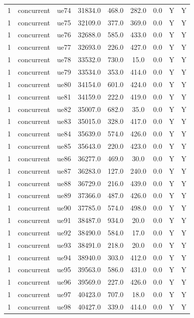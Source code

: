 \begin{table}[ht]
\begin{tabular}{|c|c|c|c|c|c|c|c|c|}
1 & concurrent & ue74 & 31834.0 & 468.0 & 282.0 & 0.0 & Y & Y \\
1 & concurrent & ue75 & 32109.0 & 377.0 & 369.0 & 0.0 & Y & Y \\
1 & concurrent & ue76 & 32688.0 & 585.0 & 433.0 & 0.0 & Y & Y \\
1 & concurrent & ue77 & 32693.0 & 226.0 & 427.0 & 0.0 & Y & Y \\
1 & concurrent & ue78 & 33532.0 & 730.0 & 15.0 & 0.0 & Y & Y \\
1 & concurrent & ue79 & 33534.0 & 353.0 & 414.0 & 0.0 & Y & Y \\
1 & concurrent & ue80 & 34154.0 & 601.0 & 424.0 & 0.0 & Y & Y \\
1 & concurrent & ue81 & 34159.0 & 222.0 & 419.0 & 0.0 & Y & Y \\
1 & concurrent & ue82 & 35007.0 & 682.0 & 35.0 & 0.0 & Y & Y \\
1 & concurrent & ue83 & 35015.0 & 328.0 & 417.0 & 0.0 & Y & Y \\
1 & concurrent & ue84 & 35639.0 & 574.0 & 426.0 & 0.0 & Y & Y \\
1 & concurrent & ue85 & 35643.0 & 220.0 & 423.0 & 0.0 & Y & Y \\
1 & concurrent & ue86 & 36277.0 & 469.0 & 30.0 & 0.0 & Y & Y \\
1 & concurrent & ue87 & 36283.0 & 127.0 & 240.0 & 0.0 & Y & Y \\
1 & concurrent & ue88 & 36729.0 & 216.0 & 439.0 & 0.0 & Y & Y \\
1 & concurrent & ue89 & 37366.0 & 487.0 & 426.0 & 0.0 & Y & Y \\
1 & concurrent & ue90 & 37785.0 & 574.0 & 498.0 & 0.0 & Y & Y \\
1 & concurrent & ue91 & 38487.0 & 934.0 & 20.0 & 0.0 & Y & Y \\
1 & concurrent & ue92 & 38490.0 & 584.0 & 17.0 & 0.0 & Y & Y \\
1 & concurrent & ue93 & 38491.0 & 218.0 & 20.0 & 0.0 & Y & Y \\
1 & concurrent & ue94 & 38940.0 & 303.0 & 412.0 & 0.0 & Y & Y \\
1 & concurrent & ue95 & 39563.0 & 586.0 & 431.0 & 0.0 & Y & Y \\
1 & concurrent & ue96 & 39569.0 & 227.0 & 426.0 & 0.0 & Y & Y \\
1 & concurrent & ue97 & 40423.0 & 707.0 & 18.0 & 0.0 & Y & Y \\
1 & concurrent & ue98 & 40427.0 & 339.0 & 414.0 & 0.0 & Y & Y \\

\end{tabular}
\end{table}
